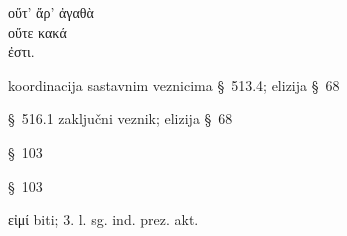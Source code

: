 {\large
\begin{greek}
\noindent οὔτ' ἄρ' ἀγαθὰ \\
οὔτε κακά \\
\tabto{2em} ἐστι.\\

\end{greek}
}

\begin{description}[noitemsep]
\item[οὔτ'\dots\ οὔτε\dots] koordinacija sastavnim veznicima §~513.4; elizija §~68
\item[ἄρ'] §~516.1 zaključni veznik; elizija §~68
\item[ἀγαθὰ] §~103
\item[κακά] §~103
\item[ἐστι] εἰμί biti; 3. l. sg. ind. prez. akt.
\end{description}



